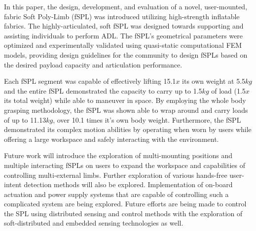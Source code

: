 \documentclass[letterpaper, 10 pt, conference]{ieeeconf}  %
\begin{document}
In this paper, the design, development, and evaluation of a novel, user-mounted, fabric Soft Poly-Limb (fSPL) was introduced utilizing high-strength inflatable fabrics. The highly-articulated, soft fSPL was designed towards supporting and assisting individuals to perform ADL. The fSPL's geometrical parameters were optimized and experimentally validated using quasi-static computational FEM models, providing design guidelines for the community to design fSPLs based on the desired payload capacity and articulation performance.

Each fSPL segment was capable of effectively lifting 15.1$x$ its own weight at 5.5$kg$ and the entire fSPL demonstrated the capacity to carry up to 1.5$kg$ of load (1.5$x$ its total weight) while able to maneuver in space. By employing the whole body grasping methodology, the fSPL was shown able to wrap around and carry loads of up to 11.13$kg$, over 10.1 times it’s own body weight. Furthermore, the fSPL demonstrated its complex motion abilities by operating when worn by users while offering a large workspace and safely interacting with the environment. 
% 
% 

Future work will introduce the exploration of multi-mounting positions and multiple interacting fSPLs on users to expand the workspace and capabilities of controlling multi-external limbs. Further exploration of various hands-free user-intent detection methods will also be explored. Implementation of on-board actuation and power supply systems that are capable of controlling such a complicated system are being explored. Future efforts are being made to control the SPL using distributed sensing and control methods \cite{wenlong2017} with the exploration of soft-distributed and embedded sensing technologies as well. 
% 



\end{document}
